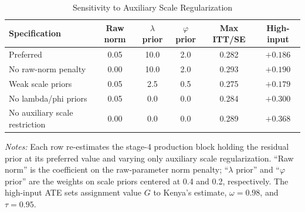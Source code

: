 \begin{table}[H]
\centering
\caption{Sensitivity to Auxiliary Scale Regularization}
\label{tab:struct_regularization_sensitivity}
\begin{threeparttable}
\footnotesize
\begin{tabular}[t]{lccccc}
\toprule
Specification & Raw norm & $\lambda$ prior & $\varphi$ prior & Max ITT/SE & High-input \\
\midrule
Preferred & 0.05 & 10.0 & 2.0 & 0.282 & $+0.186$ \\
No raw-norm penalty & 0.00 & 10.0 & 2.0 & 0.293 & $+0.190$ \\
Weak scale priors & 0.05 & 2.5 & 0.5 & 0.275 & $+0.179$ \\
No lambda/phi priors & 0.05 & 0.0 & 0.0 & 0.284 & $+0.300$ \\
No auxiliary scale restriction & 0.00 & 0.0 & 0.0 & 0.289 & $+0.368$ \\
\bottomrule
\end{tabular}
\begin{tablenotes}
\footnotesize
\item \textit{Notes:} Each row re-estimates the stage-4 production block holding the residual prior at its preferred value and varying only auxiliary scale regularization. ``Raw norm'' is the coefficient on the raw-parameter norm penalty; ``$\lambda$ prior'' and ``$\varphi$ prior'' are the weights on scale priors centered at 0.4 and 0.2, respectively. The high-input ATE sets assignment value $G$ to Kenya's estimate, $\omega=0.98$, and $\tau=0.95$.
\end{tablenotes}
\end{threeparttable}
\end{table}
